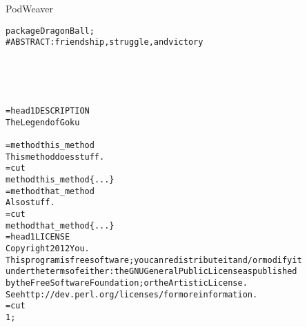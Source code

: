 \documentclass[serif,14pt,color=usenames,dvipsnames]{beamer}
\begin{document}
\begin{frame}{PodWeaver}        %
\begin{alltt}
\tiny
package DragonBall;\\
\# ABSTRACT: friendship, struggle, and victory\\
~\\
~\\
~\\
~\\
~\\
=head1 DESCRIPTION\\
The Legend of Goku\\
~\\
=method this\_method\\
This method does stuff.\\
=cut\\
method this\_method \{ ... \}\\
=method that\_method\\
Also stuff.\\
=cut\\
method that\_method \{ ... \}\\
=head1 LICENSE\\
Copyright 2012 You.\\
This program is free software; you can redistribute it and/or modify it
under the terms of either: the GNU General Public License as published
by the Free Software Foundation; or the Artistic License.\\
See http://dev.perl.org/licenses/ for more information.\\
=cut\\
1;\\
\end{alltt}
\end{frame}
\end{document}
